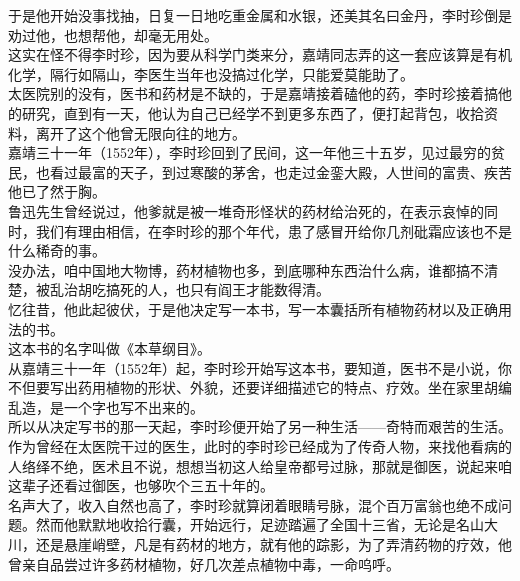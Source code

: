 \begin{multicols}{\theparacolNo}
于是他开始没事找抽，日复一日地吃重金属和水银，还美其名曰金丹，李时珍倒是劝过他，也想帮他，却毫无用处。\\

这实在怪不得李时珍，因为要从科学门类来分，嘉靖同志弄的这一套应该算是有机化学，隔行如隔山，李医生当年也没搞过化学，只能爱莫能助了。\\

太医院别的没有，医书和药材是不缺的，于是嘉靖接着磕他的药，李时珍接着搞他的研究，直到有一天，他认为自己已经学不到更多东西了，便打起背包，收拾资料，离开了这个他曾无限向往的地方。\\

嘉靖三十一年（1552年），李时珍回到了民间，这一年他三十五岁，见过最穷的贫民，也看过最富的天子，到过寒酸的茅舍，也走过金銮大殿，人世间的富贵、疾苦他已了然于胸。\\

鲁迅先生曾经说过，他爹就是被一堆奇形怪状的药材给治死的，在表示哀悼的同时，我们有理由相信，在李时珍的那个年代，患了感冒开给你几剂砒霜应该也不是什么稀奇的事。\\

没办法，咱中国地大物博，药材植物也多，到底哪种东西治什么病，谁都搞不清楚，被乱治胡吃搞死的人，也只有阎王才能数得清。\\

忆往昔，他此起彼伏，于是他决定写一本书，写一本囊括所有植物药材以及正确用法的书。\\

这本书的名字叫做《本草纲目》。\\

从嘉靖三十一年（1552年）起，李时珍开始写这本书，要知道，医书不是小说，你不但要写出药用植物的形状、外貌，还要详细描述它的特点、疗效。坐在家里胡编乱造，是一个字也写不出来的。\\

所以从决定写书的那一天起，李时珍便开始了另一种生活——奇特而艰苦的生活。\\

作为曾经在太医院干过的医生，此时的李时珍已经成为了传奇人物，来找他看病的人络绎不绝，医术且不说，想想当初这人给皇帝都号过脉，那就是御医，说起来咱这辈子还看过御医，也够吹个三五十年的。\\

名声大了，收入自然也高了，李时珍就算闭着眼睛号脉，混个百万富翁也绝不成问题。然而他默默地收拾行囊，开始远行，足迹踏遍了全国十三省，无论是名山大川，还是悬崖峭壁，凡是有药材的地方，就有他的踪影，为了弄清药物的疗效，他曾亲自品尝过许多药材植物，好几次差点植物中毒，一命呜呼。\\


\end{multicols}
